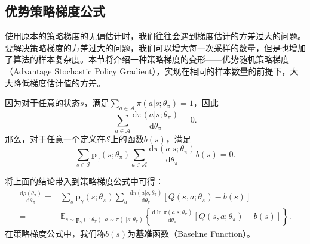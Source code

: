 \subsection{优势策略梯度公式}

使用原本的策略梯度的无偏估计时，我们往往会遇到梯度估计的方差过大的问题。要解决策略梯度的方差过大的问题，我们可以增大每一次采样的数量，但是也增加了算法的样本复杂度。本节将介绍一种策略梯度的变形——优势随机策略梯度（Advantage Stochastic Policy Gradient）\cite{greensmith2004variance,mnih2016asynchronous,grosse2016kronecker}，实现在相同的样本数量的前提下，大大降低梯度估计值的方差。

因为对于任意的状态$s$，满足$\sum_{a \in \mathcal{A}} \pi(a \vert s; \theta_\pi) = 1$，因此
\begin{equation}
    \sum_{a\in\mathcal{A}} \frac{\mathrm{d}\pi(a \vert s; \theta_\pi)}
    {\mathrm{d} \theta_\pi} = 0.
\end{equation}
那么，对于任意一个定义在$\mathcal{S}$上的函数$b(s)$，满足
\begin{equation}
    \sum_{s \in \mathcal{S}} \mathbf{p}_{\gamma}(s; \theta_\pi) 
    \sum_{a \in \mathcal{A}} 
    \frac{\mathrm{d}\pi(a \vert s; \theta_\pi)}{\mathrm{d} \theta_\pi} b(s) = 0.
\end{equation}

将上面的结论带入到策略梯度公式中可得：
\begin{equation}
\begin{aligned}
    \frac{\mathrm{d}\rho(\theta_\pi)}{\mathrm{d} \theta_\pi}
    =& \sum_{s} \mathbf{p}_{\gamma}(s;\theta_\pi) \sum_{a} 
        \frac{\mathrm{d}\pi(a \vert s; \theta_\pi)}{\mathrm{d}\theta_\pi} 
        [Q(s, a; \theta_\pi) - b(s)]\\
    =& \mathbb{E}_{s \sim \mathbf{p}_{\gamma}(\cdot; \theta_\pi), 
        a \sim \pi(\cdot \vert s; \theta_\pi)}
    \left\{ 
        \frac{\mathrm{d}\ln\pi(a \vert s; \theta_\pi)}{\mathrm{d}\theta_\pi}     
        [Q(s, a; \theta_\pi) - b(s)]
    \right\}.
\end{aligned}
\end{equation}
在策略梯度公式中，我们称$b(s)$为\textbf{基准}函数（Baseline Function）。

